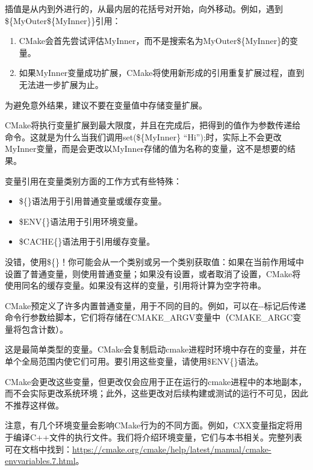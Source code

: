 插值是从内到外进行的，从最内层的花括号对开始，向外移动。例如，遇到\$\{MyOuter\$\{MyInner\}\}引用：

\begin{enumerate}
\item
CMake会首先尝试评估MyInner，而不是搜索名为MyOuter\$\{MyInner\}的变量。

\item
如果MyInner变量成功扩展，CMake将使用新形成的引用重复扩展过程，直到无法进一步扩展为止。
\end{enumerate}

为避免意外结果，建议不要在变量值中存储变量扩展。

CMake将执行变量扩展到最大限度，并且在完成后，把得到的值作为参数传递给命令。这就是为什么当我们调用set(\$\{MyInner\} “Hi”);时，实际上不会更改MyInner变量，而是会更改以MyInner存储的值为名称的变量，这不是想要的结果。

变量引用在变量类别方面的工作方式有些特殊：

\begin{itemize}
\item
\$\{\}语法用于引用普通变量或缓存变量。

\item
\$ENV\{\}语法用于引用环境变量。

\item
\$CACHE\{\}语法用于引用缓存变量。
\end{itemize}

没错，使用\$\{\}！你可能会从一个类别或另一个类别获取值：如果在当前作用域中设置了普通变量，则使用普通变量；如果没有设置，或者取消了设置，CMake将使用同名的缓存变量。如果没有这样的变量，引用将计算为空字符串。

CMake预定义了许多内置普通变量，用于不同的目的。例如，可以在-{}-标记后传递命令行参数给脚本，它们将存储在CMAKE\_ARGV变量中（CMAKE\_ARGC变量将包含计数）。


这是最简单类型的变量。CMake会复制启动cmake进程时环境中存在的变量，并在单个全局范围内使它们可用。要引用这些变量，请使用\$ENV\{\}语法。

CMake会更改这些变量，但更改仅会应用于正在运行的cmake进程中的本地副本，而不会实际更改系统环境；此外，这些更改对后续构建或测试的运行不可见，因此不推荐这样做。

注意，有几个环境变量会影响CMake行为的不同方面。例如，CXX变量指定将用于编译C++文件的执行文件。我们将介绍环境变量，它们与本书相关。完整列表可在文档中找到：\url{https://cmake.org/cmake/help/latest/manual/cmake-envvariables.7.html}。

